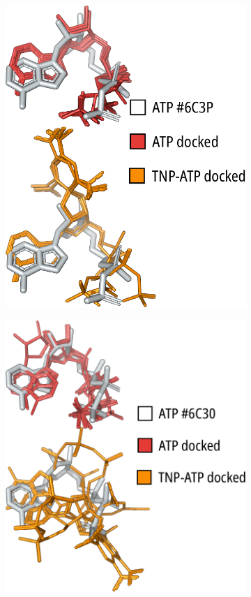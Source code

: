 \begin{figure}[h]
\begin{subfigure}[t]{0.28\textwidth}
		\includegraphics[width=\textwidth]{6c3p_docking.pdf}
	\end{subfigure}
	\hfill
	\begin{subfigure}[t]{0.30\textwidth}
		\caption{}\label{ch3fig:6c3o_docking}
		\centering
		\includegraphics[width=\textwidth]{6c3o_docking.pdf}

\end{subfigure}
\end{figure}
